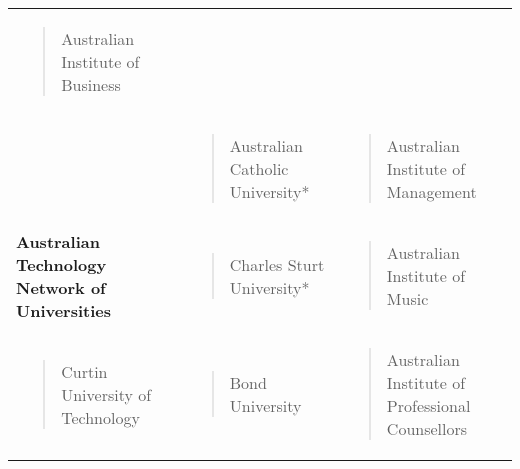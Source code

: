 \documentclass[]{book}
\begin{document}
\begin{longtable}[]{@{}lll@{}}
\begin{minipage}[t]{0.32\columnwidth}
\begin{quote}
Australian Institute of Business
\end{quote}\strut
\end{minipage}\tabularnewline
\begin{minipage}[t]{0.32\columnwidth}\raggedright
\strut
\end{minipage} & \begin{minipage}[t]{0.32\columnwidth}\raggedright
\begin{quote}
Australian Catholic University*
\end{quote}\strut
\end{minipage} & \begin{minipage}[t]{0.32\columnwidth}\raggedright
\begin{quote}
Australian Institute of Management
\end{quote}\strut
\end{minipage}\tabularnewline
\begin{minipage}[t]{0.32\columnwidth}\raggedright
\textbf{Australian Technology Network of Universities}\strut
\end{minipage} & \begin{minipage}[t]{0.32\columnwidth}\raggedright
\begin{quote}
Charles Sturt University*
\end{quote}\strut
\end{minipage} & \begin{minipage}[t]{0.32\columnwidth}\raggedright
\begin{quote}
Australian Institute of Music
\end{quote}\strut
\end{minipage}\tabularnewline
\begin{minipage}[t]{0.32\columnwidth}\raggedright
\begin{quote}
Curtin University of Technology
\end{quote}\strut
\end{minipage} & \begin{minipage}[t]{0.32\columnwidth}\raggedright
\begin{quote}
Bond University
\end{quote}\strut
\end{minipage} & \begin{minipage}[t]{0.32\columnwidth}\raggedright
\begin{quote}
Australian Institute of Professional Counsellors
\end{quote}\strut
\end{minipage}\tabularnewline

\end{longtable}
\end{document}
